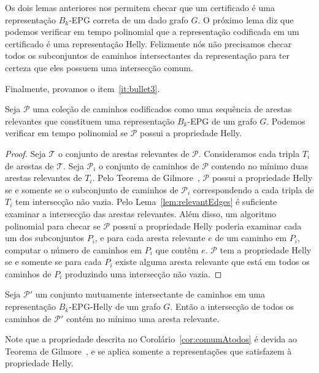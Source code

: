 Os dois lemas anteriores nos permitem checar que um certificado é uma representação $B_k$-EPG correta de um dado grafo $G$. O próximo lema diz que podemos verificar em tempo polinomial que a representação codificada em um certificado é uma representação Helly. Felizmente nós não precisamos checar todos os subconjuntos de caminhos intersectantes da representação para ter certeza que eles possuem uma intersecção comum.

Finalmente, provamos o item~\ref{it:bullet3}.


\begin{lema}\label{lem:verify3}
Seja $\mathcal{P}$ uma coleção de caminhos codificados como uma sequência de arestas relevantes que constituem uma representação $B_k$-EPG  de um grafo  $G$. Podemos verificar em tempo polinomial se $\mathcal{P}$  possui a propriedade Helly.
\end{lema}


\begin{proof}
Seja $\mathcal{T}$ o conjunto de arestas relevantes de $\mathcal{P}$. Consideramos cada tripla $T_i$ de arestas de  $\mathcal{T}$. Seja $\mathcal{P}_i$ o conjunto de caminhos de  $\mathcal{P}$ contendo no mínimo duas arestas relevantes de $T_i$. Pelo Teorema de Gilmore~\cite{bergeDuchet1975}, $\mathcal{P}$ possui a propriedade Helly se e somente se o subconjunto de caminhos de $\mathcal{P}_i$ correspondendo a cada tripla de $T_i$ tem intersecção não vazia.  Pelo Lema~\ref{lem:relevantEdges} é suficiente examinar a intersecção das arestas relevantes.  Além disso, um algoritmo polinomial para checar se $\mathcal{P}$ possui a propriedade Helly poderia examinar cada um dos subconjuntos $P_i$, e para cada aresta relevante $e$ de um caminho em $P_i$, computar o número de caminhos em $P_i$ que contêm $e$. $\mathcal{P}$ tem a propriedade Helly se e somente se para cada $P_i$ existe alguma aresta relevante que está em todos os caminhos de $P_i$ produzindo uma intersecção não vazia.
 \end{proof} %


\begin{corollary}\label{cor:comumAtodos}
Seja ${\mathcal P'}$ um conjunto mutuamente intersectante de caminhos em uma representação $B_k$-EPG-Helly de um grafo  $G$. Então a intersecção de todos os caminhos de ${\mathcal P'}$ contém no mínimo uma aresta relevante.
\end{corollary}

Note que a propriedade descrita no Corolário~\ref{cor:comumAtodos} é devida ao Teorema de Gilmore~\cite{bergeDuchet1975}, e se aplica somente a representações que satisfazem à propriedade Helly.

